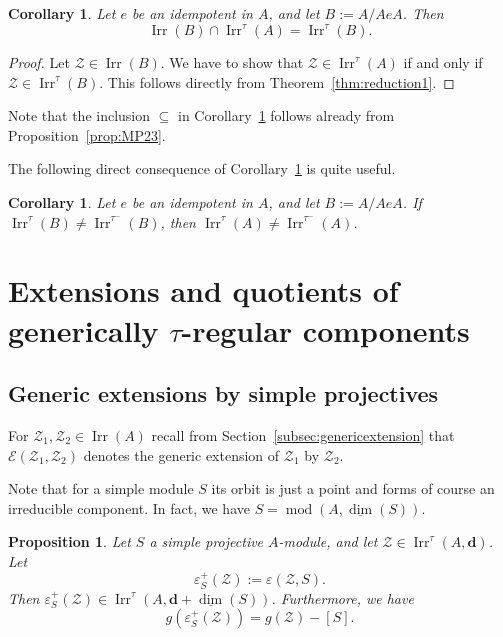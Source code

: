 \documentclass[12pt,reqno]{amsart}
\newtheorem{Cor}[Thm]{Corollary}
\newtheorem{Prop}[Thm]{Proposition}
\theoremstyle{definition}
\newcommand{\cE}{{\mathcal E}}
\newcommand{\bd}{\mathbf{d}}
\newcommand{\md}{\operatorname{mod}}
\newcommand{\dimv}{\underline{\dim}}
\newcommand{\irr}{\operatorname{Irr}}
\newcommand{\calZ}{\mathcal{Z}}
\begin{document}
\begin{Cor} \label{cor:reduction2}
Let $e$ be an idempotent in $A$, and let $B := A/AeA$.
Then
$$
\irr(B) \cap \irr^\tau(A) = \irr^\tau(B).
$$
\end{Cor}

\begin{proof}
Let $\calZ \in \irr(B)$.
We have to show that $\calZ \in \irr^\tau(A)$ if and only
if $\calZ \in \irr^\tau(B)$.
This follows directly from Theorem~\ref{thm:reduction1}.
\end{proof}


Note that the inclusion $\subseteq$ in Corollary~\ref{cor:reduction2}
follows already from Proposition~\ref{prop:MP23}.

The following direct consequence of Corollary~\ref{cor:reduction2}
is quite useful.


\begin{Cor}\label{cor:reduction3}
Let $e$ be an idempotent in $A$, and let $B := A/AeA$.
If
$\irr^\tau(B) \not= \irr^{\tau^-}(B)$, then
$\irr^\tau(A) \not= \irr^{\tau^-}(A)$.
\end{Cor}




\section{Extensions and quotients of generically $\tau$-regular components}\label{sec:extensions}




\subsection{Generic extensions by simple projectives}
For $\calZ_1,\calZ_2 \in \irr(A)$
recall from
Section~\ref{subsec:genericextension}
that $\cE(\calZ_1,\calZ_2)$ denotes the generic extension
of $\calZ_1$ by $\calZ_2$.

Note that
for a simple module $S$ its orbit is just a point and forms
of course an irreducible component.
In fact, we have $S = \md(A,\dimv(S))$.


\begin{Prop} \label{prop:ext}
Let $S$ a simple projective $A$-module, and let
$\calZ \in \irr^\tau(A,\bd)$.
Let
$$
\varepsilon_S^+(\calZ) := \varepsilon(\calZ,S).
$$
Then $\varepsilon_S^+(\calZ) \in \irr^\tau(A,\bd+\dimv(S))$.
Furthermore, we have
$$
g(\varepsilon_S^+(\calZ)) =  g(\calZ) - [S].
$$
\end{Prop}
\end{document}
